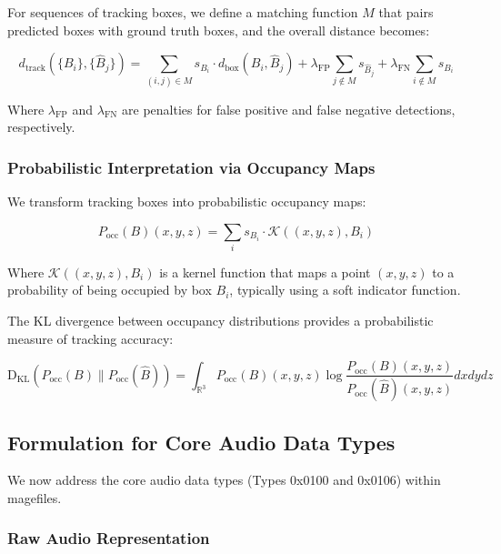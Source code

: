 For sequences of tracking boxes, we define a matching function $M$ that pairs predicted boxes with ground truth boxes, and the overall distance becomes:

\begin{equation}
d_{\text{track}}(\{B_i\}, \{\hat{B}_j\}) = \sum_{(i,j) \in M} s_{B_i} \cdot d_{\text{box}}(B_i, \hat{B}_j) + \lambda_{\text{FP}} \sum_{j \not\in M} s_{\hat{B}_j} + \lambda_{\text{FN}} \sum_{i \not\in M} s_{B_i}
\end{equation}

Where $\lambda_{\text{FP}}$ and $\lambda_{\text{FN}}$ are penalties for false positive and false negative detections, respectively.

\subsubsection{Probabilistic Interpretation via Occupancy Maps}

We transform tracking boxes into probabilistic occupancy maps:

\begin{equation}
P_{\text{occ}}(B)(x,y,z) = \sum_i s_{B_i} \cdot \mathcal{K}((x,y,z), B_i)
\end{equation}

Where $\mathcal{K}((x,y,z), B_i)$ is a kernel function that maps a point $(x,y,z)$ to a probability of being occupied by box $B_i$, typically using a soft indicator function.

The KL divergence between occupancy distributions provides a probabilistic measure of tracking accuracy:

\begin{equation}
\mathrm{D_{KL}}(P_{\text{occ}}(B) \| P_{\text{occ}}(\hat{B})) = \int_{\mathbb{R}^3} P_{\text{occ}}(B)(x,y,z) \log\frac{P_{\text{occ}}(B)(x,y,z)}{P_{\text{occ}}(\hat{B})(x,y,z)} dx dy dz
\end{equation}

\subsection{Formulation for Core Audio Data Types}

We now address the core audio data types (Types 0x0100 and 0x0106) within magefiles.

\subsubsection{Raw Audio Representation}


